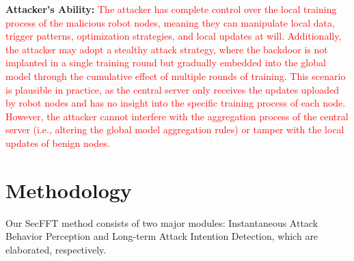 \documentclass[lettersize,journal]{IEEEtran}
\begin{document}
\textbf{Attacker's Ability:} 
\textcolor{red}{The attacker has complete control over the local training process of the malicious robot nodes, meaning they can manipulate local data, trigger patterns, optimization strategies, and local updates at will. Additionally, the attacker may adopt a stealthy attack strategy, where the backdoor is not implanted in a single training round but gradually embedded into the global model through the cumulative effect of multiple rounds of training. This scenario is plausible in practice, as the central server only receives the updates uploaded by robot nodes and has no insight into the specific training process of each node. However, the attacker cannot interfere with the aggregation process of the central server (i.e., altering the global model aggregation rules) or tamper with the local updates of benign nodes.}




\section{Methodology}
Our SecFFT method consists of two major modules: Instantaneous Attack Behavior Perception and Long-term Attack Intention Detection, which are elaborated, respectively.
\end{document}
